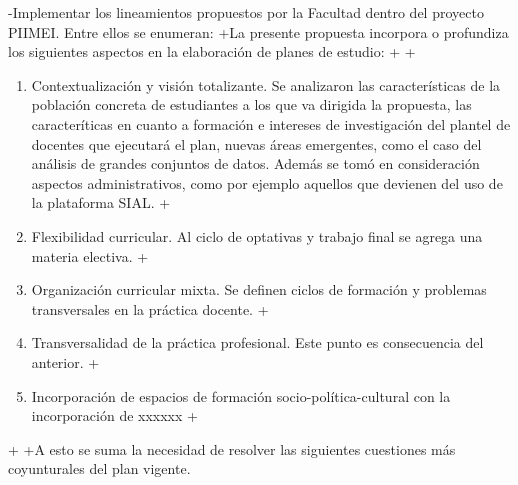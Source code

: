 -Implementar los lineamientos propuestos por la Facultad dentro del proyecto PIIMEI. Entre ellos se enumeran:
+La presente propuesta incorpora o profundiza los siguientes aspectos en la elaboración de planes de estudio: 
+
+\begin{enumerate}
+\item Contextualización y visión totalizante. Se analizaron las características de la población concreta de estudiantes a los que va dirigida la propuesta, las caracteríticas en cuanto a formación e intereses de investigación del plantel de docentes que ejecutará el plan, nuevas áreas emergentes, como el caso del análisis de grandes conjuntos de datos. Además se tomó en consideración aspectos administrativos, como por ejemplo aquellos que devienen del uso de la plataforma SIAL. 
+\item Flexibilidad curricular. Al ciclo de optativas y trabajo final se agrega una materia electiva.
+\item Organización curricular mixta. Se definen ciclos de formación y problemas transversales en la práctica docente. 
+\item Transversalidad de la práctica profesional. Este punto es consecuencia del anterior.
+\item Incorporación de espacios de formación socio-política-cultural con la incorporación de xxxxxx
+\end{enumerate}
+
+A esto se suma la necesidad de resolver las siguientes cuestiones más coyunturales del plan vigente.
 
